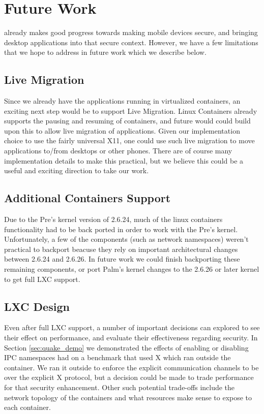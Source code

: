 \section{Future Work}
    \emph{\proj} already makes good progress towards making mobile devices secure, and bringing desktop applications into that secure context.  However, we have a few limitations that we hope to address in future work which we describe below.
\subsection{Live Migration}
Since we already have the applications running in virtualized containers, an exciting next step would be to support Live Migration.  Linux Containers already supports the pausing and resuming of containers, and future would could build upon this to allow live migration of applications.  Given our implementation choice to use the fairly universal X11, one could use such live migration to move applications to/from desktops or other phones.  There are of course many implementation details to make this practical, but we believe this could be a useful and exciting direction to take our work.

\subsection{Additional Containers Support}
Due to the Pre's kernel version of 2.6.24, much of the linux containers functionality had to be back ported in order to work with the Pre's kernel.  Unfortunately, a few of the components (such as network namespaces) weren't practical to backport beacuse they rely on important architectural changes between 2.6.24 and 2.6.26.  In future work we could finish backporting these remaining components, or port Palm's kernel changes to the 2.6.26 or later kernel to get full LXC support.

\subsection{LXC Design}
Even after full LXC support, a number of important decisions can explored to see their effect on performance, and evaluate their effectiveness regarding security.  In Section \ref{sec:quake_demo} we demonstrated the effects of enabling or disabling IPC namespaces had on a benchmark that used X which ran outside the container.  We ran it outside to enforce the explicit communication channels to be over the explicit X protocol, but a decision could be made to trade performance for that security enhancement.  Other such potential trade-offs include the network topology of the containers and what resources make sense to expose to each container.

